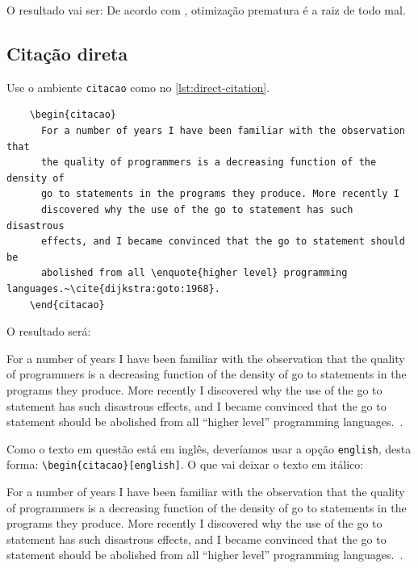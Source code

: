 O resultado vai ser: De acordo com \textcite{knuth:goto:1974}, otimização prematura é a raiz de todo mal.

\subsection{Citação direta}

Use o ambiente \texttt{citacao} como no \autoref{lst:direct-citation}.

\begin{listing}[htb]
  \begin{verbatim}
    \begin{citacao}
      For a number of years I have been familiar with the observation that
      the quality of programmers is a decreasing function of the density of
      go to statements in the programs they produce. More recently I
      discovered why the use of the go to statement has such disastrous
      effects, and I became convinced that the go to statement should be
      abolished from all \enquote{higher level} programming languages.~\cite{dijkstra:goto:1968}.
    \end{citacao}
  \end{verbatim}
  \caption{Citação direta}
  \label{lst:direct-citation}
\end{listing}

O resultado será:

\begin{citacao}
  For a number of years I have been familiar with the observation that
  the quality of programmers is a decreasing function of the density of
  go to statements in the programs they produce. More recently I
  discovered why the use of the go to statement has such disastrous
  effects, and I became convinced that the go to statement should be
  abolished from all \enquote{higher level} programming languages.~\cite{dijkstra:goto:1968}.
\end{citacao}

Como o texto em questão está em inglês, deveríamos usar a opção \texttt{english}, desta forma:
\texttt{\textbackslash{}begin\{citacao\}[english]}. O que vai deixar o texto em itálico:

\begin{citacao}[english]
  For a number of years I have been familiar with the observation that
  the quality of programmers is a decreasing function of the density of
  go to statements in the programs they produce. More recently I
  discovered why the use of the go to statement has such disastrous
  effects, and I became convinced that the go to statement should be
  abolished from all \enquote{higher level} programming languages.~\cite{dijkstra:goto:1968}.
\end{citacao}

